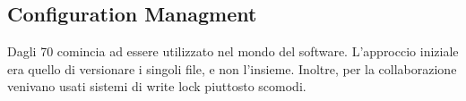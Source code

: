 \documentclass[a4paper,12pt]{article}
\begin{document}
\begin{itemize}
\subsection{Configuration Managment}
\noindent Dagli 70 comincia ad essere utilizzato nel mondo del software.
L'approccio iniziale era quello di versionare i singoli file, e non l'insieme. Inoltre, per la collaborazione venivano usati sistemi di write lock piuttosto scomodi.

\end{itemize}
\end{document}
